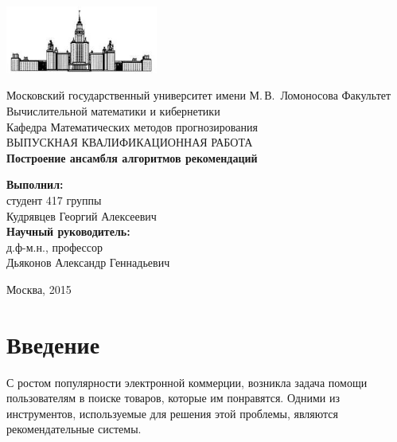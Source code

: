 \documentclass[a4paper,12pt]{article}
\begin{document}
\begin{titlepage}
\begin{center}

    \bigskip
    \includegraphics[width=50mm]{titul_cartoon}

    \bigskip
    Московский государственный университет имени М.\,В.~Ломоносова
    Факультет Вычислительной математики и кибернетики\\
    Кафедра Математических методов прогнозирования\\[30mm]

    \textsf{\large
      ВЫПУСКНАЯ КВАЛИФИКАЦИОННАЯ РАБОТА \\[10mm]
      \textbf{
        Построение ансамбля алгоритмов рекомендаций
      }
    }\\[30mm]

    \begin{flushright}
      \parbox{0.5\textwidth}{
        \raggedleft
        \textbf{Выполнил:}\\
        студент 417 группы\\
        Кудрявцев Георгий Алексеевич\\[5mm]
        \textbf{Научный руководитель:}\\
        д.ф-м.н., профессор\\
        Дьяконов Александр Геннадьевич
      }
    \end{flushright}

    \vspace{\fill}
    Москва, 2015
\end{center}
\end{titlepage}
\thispagestyle{empty} %
\newpage

\tableofcontents %
\newpage
\section{Введение}

С ростом популярности электронной коммерции, возникла задача помощи пользователям в поиске товаров, которые им понравятся. Одними из инструментов, используемые для решения этой проблемы, являются рекомендательные системы. 
\end{document}
